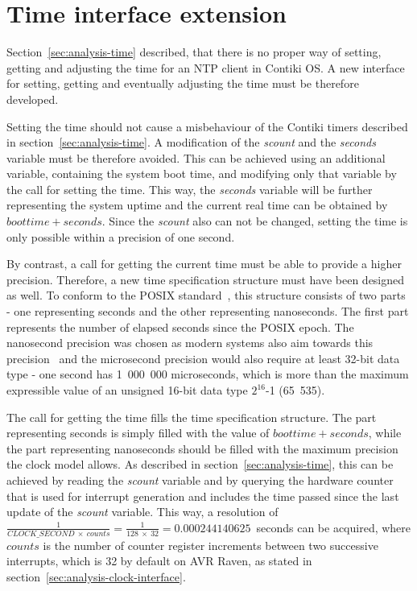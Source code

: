 
\section{Time interface extension}\label{sec:analysis-interface}
Section~\ref{sec:analysis-time} described, that there is no proper
way of setting, getting and adjusting the time for an NTP client in Contiki OS.
A new interface for setting, getting and eventually adjusting the time
must be therefore developed.

Setting the time should not cause a misbehaviour of the Contiki timers
described in section~\ref{sec:analysis-time}.
A modification of the {\it{scount}} and the {\it{seconds}} variable must be therefore avoided.
This can be achieved using an additional variable, containing the system boot time,
and modifying only that variable by the call for setting the time.
This way, the {\it{seconds}} variable will be further representing the system uptime
and the current real time can be obtained by $boottime + seconds$.
Since the {\it{scount}} also can not be changed, setting the time is only possible
within a precision of one second.

By contrast, a call for getting the current time must be able to provide a higher precision.
Therefore, a new time specification structure must have been designed as well.
To conform to the POSIX standard~\cite{posix}, this structure consists of two parts -
one representing seconds and the other representing nanoseconds.
The first part represents the number of elapsed seconds since the POSIX epoch.
The nanosecond precision was chosen as modern systems also aim towards this
precision~\cite{posix,ntp-precision} and
the microsecond precision would also require at least 32-bit data type -
one second has 1~000~000 microseconds, which is more than the maximum expressible value of
an unsigned 16-bit data type $2^{16}$-1 (65~535).

The call for getting the time fills the time specification structure.
The part representing seconds is simply filled with the value of $boottime + seconds$,
while the part representing nanoseconds should be filled with the maximum precision
the clock model allows.
As described in section~\ref{sec:analysis-time},
this can be achieved by reading the {\it{scount}} variable
and by querying the hardware counter that is used for
interrupt generation and includes the time passed since
the last update of the {\it{scount}} variable.
This way, a resolution of
$\frac{1}{CLOCK\_SECOND~\times~counts} = \frac{1}{128~\times~32} = 0.000244140625$~seconds
can be acquired,
where $counts$ is the number of counter register increments between two successive interrupts,
which is 32 by default on AVR Raven, as stated in section~\ref{sec:analysis-clock-interface}.

